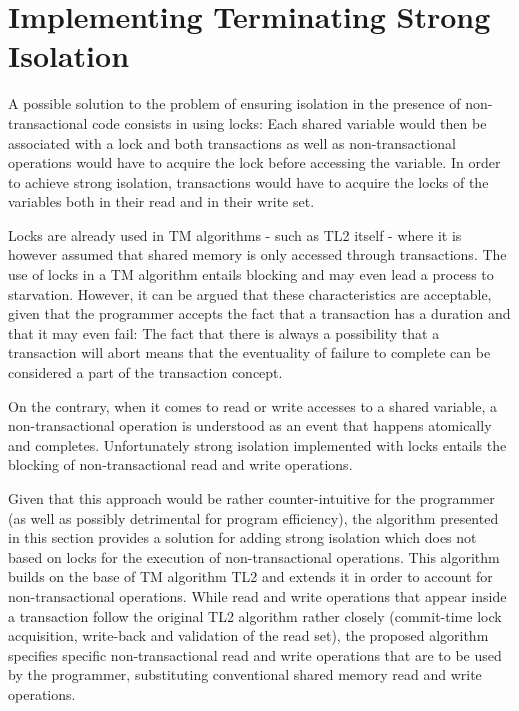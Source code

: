 \documentclass[runningheads,a4paper]{llncs}
\begin{document}
\section{Implementing Terminating Strong  Isolation}
\label{sec:protocol}

A possible  solution to  the problem of  ensuring isolation   in the
presence of  non-transactional code consists in using  locks: Each shared
variable would then  
be associated with a lock and both transactions as well as non-transactional 
operations would have to acquire the lock before accessing the variable. In
order  to achieve strong isolation,  transactions would have to acquire the
locks of the  variables both in their read and in their write set.

Locks are already used  in TM algorithms - such as TL2  itself - where it is
however     assumed   that  shared   memory   is   only  accessed   through
transactions. The use  of locks  in a TM algorithm  entails blocking and may
even lead a process to starvation. However,  
it can be argued that  these characteristics are acceptable, given that the
programmer  accepts the fact that a  transaction has a duration and that it
may  even  fail: The  fact  that   there is  always  a  possibility that  a
transaction will abort means that the eventuality of  
failure to complete can be considered a part of the transaction concept.  

On  the contrary,  when it  comes to  read or  write accesses  to  a shared
variable, a  non-transactional operation is  understood  as an
event  that  happens   atomically  and   completes.  Unfortunately   strong
isolation  implemented with  locks  entails the blocking  
of non-transactional read and write operations.

Given that this approach would be rather counter-intuitive for the 
programmer (as well as possibly detrimental for program efficiency), 
the   algorithm presented  in this  section  provides  a solution  for adding
strong isolation which does not based on locks for the execution 
of non-transactional  operations. This  algorithm builds on  the base  of TM
algorithm  TL2 and  extends it in  order to account for  non-transactional 
operations. While read   and write operations that appear inside a 
transaction follow the original TL2 algorithm rather closely (commit-time lock 
acquisition, write-back and validation of the  read set), 
the proposed algorithm 
specifies specific non-transactional read and  write operations 
that are to be used 
by the programmer, substituting conventional
shared memory read and write operations. 
\end{document}
